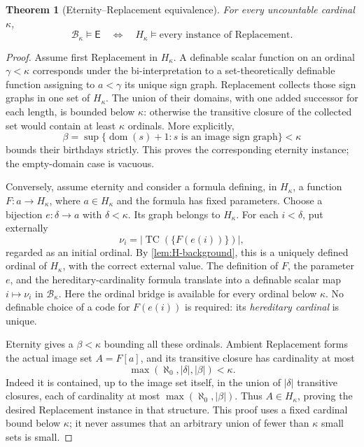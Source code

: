 \documentclass[11pt,letterpaper]{article}
\newtheorem{theorem}{Theorem}[section]
\theoremstyle{definition}
\theoremstyle{remark}
\newcommand{\TC}{\operatorname{TC}}
\newcommand{\B}{\mathcal B}
\newcommand{\Etern}{\mathsf E}
\newcommand{\card}[1]{\lvert#1\rvert}
\newcommand{\dom}{\operatorname{dom}}
\begin{document}
\begin{theorem}[Eternity--Replacement equivalence]
\label{thm:eternity-replacement}
For every uncountable cardinal $\kappa$,
\[
 \B_\kappa\models\Etern
 \quad\Longleftrightarrow\quad
 H_\kappa\models\text{every instance of Replacement}.
\]
\end{theorem}
\begin{proof}
Assume first Replacement in $H_\kappa$. A definable scalar function on an
ordinal $\gamma<\kappa$ corresponds under the bi-interpretation to a
set-theoretically definable function assigning to $a<\gamma$ its unique
sign graph. Replacement collects those sign graphs in one set of
$H_\kappa$. The union of their domains, with one added successor for each
length, is bounded below $\kappa$: otherwise the transitive closure of the
collected set would contain at least $\kappa$ ordinals. More explicitly,
\[
 \beta=\sup\{\dom(s)+1:s\text{ is an image sign graph}\}<\kappa
\]
bounds their birthdays strictly. This proves the corresponding eternity
instance; the empty-domain case is vacuous.

Conversely, assume eternity and consider a formula defining, in
$H_\kappa$, a function $F:a\to H_\kappa$, where $a\in H_\kappa$ and the
formula has fixed parameters. Choose a bijection $e:\delta\to a$ with
$\delta<\kappa$. Its graph belongs to $H_\kappa$. For each $i<\delta$, put
externally
\[
 \nu_i=\card{\TC(\{F(e(i))\})},
\]
regarded as an initial ordinal. By \cref{lem:H-background}, this is a
uniquely defined ordinal of $H_\kappa$, with the correct external value.
The definition of $F$, the parameter $e$, and the hereditary-cardinality
formula translate into a definable scalar map $i\mapsto\nu_i$ in
$\B_\kappa$. Here the ordinal bridge is available for every ordinal below
$\kappa$. No definable choice of a code for $F(e(i))$ is required: its
\emph{hereditary cardinal} is unique.

Eternity gives a $\beta<\kappa$ bounding all these ordinals. Ambient
Replacement forms the actual image set $A=F[a]$, and its transitive closure
has cardinality at most
\[
 \max(\aleph_0,\card\delta,\card\beta)<\kappa.
\]
Indeed it is contained, up to the image set itself, in the union of
$\card\delta$ transitive closures, each of cardinality at most
$\max(\aleph_0,\card\beta)$. Thus $A\in H_\kappa$, proving the desired
Replacement instance in that structure. This proof uses a fixed cardinal
bound below $\kappa$; it never assumes that an arbitrary union of fewer than
$\kappa$ small sets is small.
\end{proof}
\end{document}
